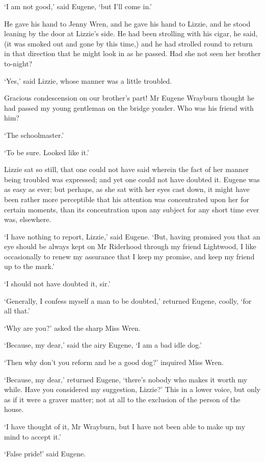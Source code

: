 ‘I am not good,’ said Eugene, ‘but I’ll come in.’

He gave his hand to Jenny Wren, and he gave his hand to Lizzie, and he
stood leaning by the door at Lizzie’s side. He had been strolling with
his cigar, he said, (it was smoked out and gone by this time,) and he
had strolled round to return in that direction that he might look in as
he passed. Had she not seen her brother to-night?

‘Yes,’ said Lizzie, whose manner was a little troubled.

Gracious condescension on our brother’s part! Mr Eugene Wrayburn thought
he had passed my young gentleman on the bridge yonder. Who was his
friend with him?

‘The schoolmaster.’

‘To be sure. Looked like it.’

Lizzie sat so still, that one could not have said wherein the fact of
her manner being troubled was expressed; and yet one could not have
doubted it. Eugene was as easy as ever; but perhaps, as she sat with
her eyes cast down, it might have been rather more perceptible that
his attention was concentrated upon her for certain moments, than its
concentration upon any subject for any short time ever was, elsewhere.

‘I have nothing to report, Lizzie,’ said Eugene. ‘But, having promised
you that an eye should be always kept on Mr Riderhood through my friend
Lightwood, I like occasionally to renew my assurance that I keep my
promise, and keep my friend up to the mark.’

‘I should not have doubted it, sir.’

‘Generally, I confess myself a man to be doubted,’ returned Eugene,
coolly, ‘for all that.’

‘Why are you?’ asked the sharp Miss Wren.

‘Because, my dear,’ said the airy Eugene, ‘I am a bad idle dog.’

‘Then why don’t you reform and be a good dog?’ inquired Miss Wren.

‘Because, my dear,’ returned Eugene, ‘there’s nobody who makes it worth
my while. Have you considered my suggestion, Lizzie?’ This in a lower
voice, but only as if it were a graver matter; not at all to the
exclusion of the person of the house.

‘I have thought of it, Mr Wrayburn, but I have not been able to make up
my mind to accept it.’

‘False pride!’ said Eugene.

